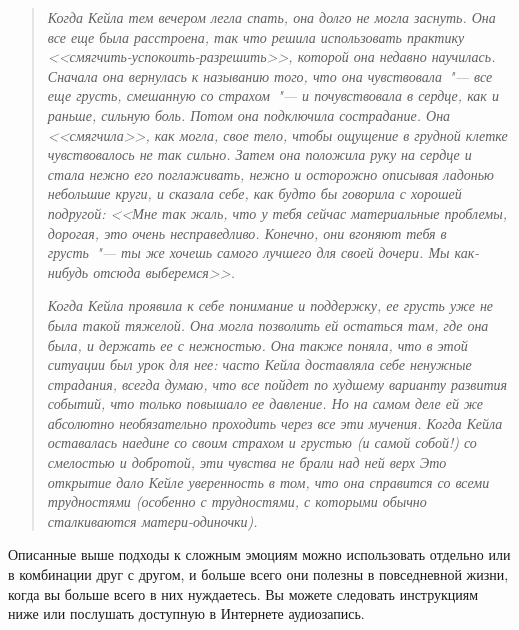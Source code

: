 \begin{quotation}
	\textit{
		Когда Кейла тем вечером легла спать, она долго не могла заснуть. Она все еще была расстроена, так что решила использовать практику <<смягчить-успокоить-разрешить>>, которой она недавно научилась. Сначала она вернулась к называнию того, что она чувствовала~"--- все еще грусть, смешанную со страхом~"---  и почувствовала в сердце, как и раньше, сильную боль. Потом она подключила сострадание. Она <<смягчила>>, как могла, свое тело, чтобы ощущение в грудной клетке чувствовалось не так сильно. Затем она положила руку на сердце и стала нежно его поглаживать, нежно и осторожно описывая ладонью небольшие круги, и сказала себе, как будто бы говорила с хорошей подругой: <<Мне так жаль, что у тебя сейчас материальные проблемы, дорогая, это очень несправедливо. Конечно, они вгоняют тебя в грусть~"--- ты же хочешь самого лучшего для своей дочери. Мы как-нибудь отсюда выберемся>>.
	}
	
	\textit{
		Когда Кейла проявила к себе понимание и поддержку, ее грусть уже не была такой тяжелой. Она могла позволить ей остаться там, где она была, и держать ее с нежностью. Она также поняла, что в этой ситуации был урок для нее: часто Кейла доставляла себе ненужные страдания, всегда думаю, что все пойдет по худшему варианту развития событий, что только повышало ее давление. Но на самом деле ей же абсолютно необязательно проходить через все эти мучения. Когда Кейла оставалась наедине со своим страхом и грустью (и самой собой!) со смелостью и добротой, эти чувства не брали над ней верх Это открытие дало Кейле уверенность в том, что она справится со всеми трудностями (особенно с трудностями, с которыми обычно сталкиваются матери-одиночки).
	}	
\end{quotation}


\newpage
{} \label{IP:Working_with_Difficult_Emotions}

Описанные выше подходы к сложным эмоциям можно использовать отдельно или в комбинации друг с другом, и больше всего они полезны в повседневной жизни, когда вы больше всего в них нуждаетесь. Вы можете следовать инструкциям ниже или послушать доступную в Интернете аудиозапись.

